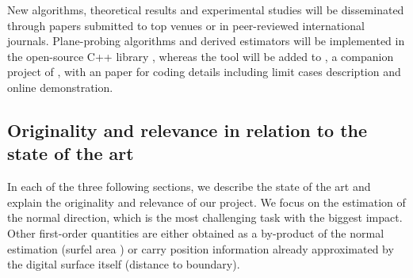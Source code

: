 New algorithms, theoretical results and experimental studies will be disseminated through papers submitted to
top venues or in peer-reviewed international journals. Plane-probing algorithms and derived estimators
will be implemented in the open-source C++ library {\DGtal}, whereas the tool will be added to {\DGtalTools},
a companion project of {\DGtal}, with an {\IPOL} paper for coding details including limit cases description and online demonstration. 

 


\subsection{Originality and relevance in relation to the state of the art}
\label{sec:art}


In each of the three following sections, we describe the state of the art and explain the originality and relevance of our project.
We focus on the estimation of the normal direction, which is the most challenging task with the biggest impact. 
Other first-order quantities are either obtained as a by-product of the normal estimation (\eg surfel area \cite{Lachaud2016})
or carry position information already approximated by the digital surface itself (\eg distance to boundary).


